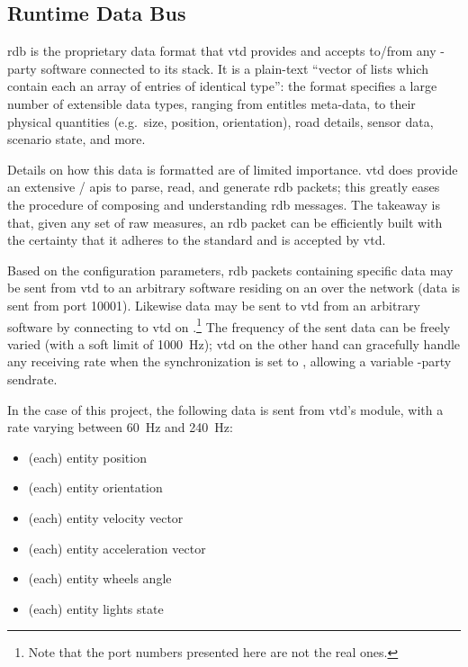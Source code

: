 \subsection{Runtime Data Bus}

\gls{rdb} is the proprietary data format that \gls{vtd} provides and accepts to/from any -party software connected to its stack. It is a plain-text \enquote{vector of lists which contain each an array of entries of identical type}{\cite{software:rdbfaqs}}: the format specifies a large number of extensible data types, ranging from entitles meta-data, to their physical quantities (e.g.\ size, position, orientation), road details, sensor data, scenario state, and more.

Details on how this data is formatted are of limited importance. \gls{vtd} does provide an extensive / \glspl{api} to parse, read, and generate \gls{rdb} packets; this greatly eases the procedure of composing and understanding \gls{rdb} messages. The takeaway is that, given any set of raw measures, an \gls{rdb} packet can be efficiently built with the certainty that it adheres to the standard and is accepted by \gls{vtd}.

Based on the configuration parameters, \gls{rdb} packets containing specific data may be sent from \gls{vtd} to an arbitrary software residing on an  over the network (data is sent from port \num{10001}). Likewise data may be sent to \gls{vtd} from an arbitrary software by connecting to \gls{vtd} on .\footnote{Note that the port numbers presented here are not the real ones.} The frequency of the sent data can be freely varied (with a soft limit of \SI{1000}{\hertz}); \gls{vtd} on the other hand can gracefully handle any receiving rate when the synchronization is set to , allowing a variable -party sendrate.



In the case of this project, the following data is sent from \gls{vtd}'s  module, with a rate varying between \SI{60}{\hertz} and \SI{240}{\hertz}:

\begin{itemize}
	\item (each) entity position
	\item (each) entity orientation
	\item (each) entity velocity vector
	\item (each) entity acceleration vector
	\item (each) entity wheels angle
	\item (each) entity lights state
\end{itemize}

